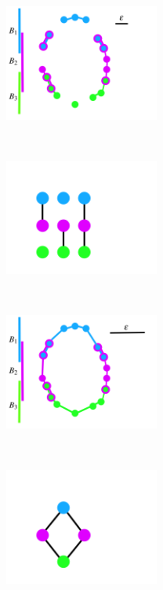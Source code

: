 \begin{figure}[!htbp]
	\centering
	\begin{subfigure}[t]{0.4\textwidth}
		\centering
		\includegraphics[height=1.5in]{torus_approximation_small_colored.png}
		
	\end{subfigure}
	~ 
	\begin{subfigure}[t]{0.4\textwidth}
		\centering
		\includegraphics[height=1.5in]{mapper_of_torus_small.png}
		
	\end{subfigure}
	
	~ 
	\begin{subfigure}[t]{0.4\textwidth}
		\centering
		\includegraphics[height=1.5in]{torus_approximation_colored.png}
		
	\end{subfigure}
	~ 
	\begin{subfigure}[t]{0.4\textwidth}
		\centering
		\includegraphics[height=1.5in]{mapper_of_torus.png}
		

\end{subfigure}
\end{figure}
